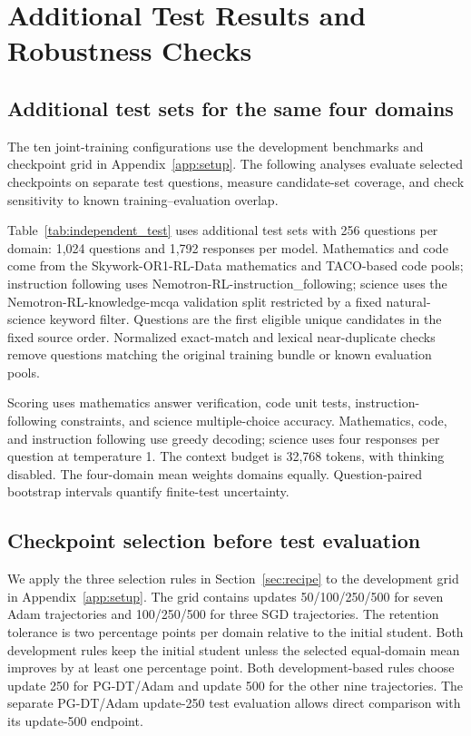 \section{Additional Test Results and Robustness Checks}
\label{app:completed_results}

\subsection{Additional test sets for the same four domains}
\label{app:independent_domain_test}

The ten joint-training configurations use the development benchmarks and checkpoint grid in Appendix~\ref{app:setup}. The following analyses evaluate selected checkpoints on separate test questions, measure candidate-set coverage, and check sensitivity to known training--evaluation overlap.

Table~\ref{tab:independent_test} uses additional test sets with 256 questions per domain: 1,024 questions and 1,792 responses per model. Mathematics and code come from the Skywork-OR1-RL-Data mathematics and TACO-based code pools; instruction following uses Nemotron-RL-instruction\_following; science uses the Nemotron-RL-knowledge-mcqa validation split restricted by a fixed natural-science keyword filter. Questions are the first eligible unique candidates in the fixed source order. Normalized exact-match and lexical near-duplicate checks remove questions matching the original training bundle or known evaluation pools.

Scoring uses mathematics answer verification, code unit tests, instruction-following constraints, and science multiple-choice accuracy. Mathematics, code, and instruction following use greedy decoding; science uses four responses per question at temperature 1. The context budget is 32,768 tokens, with thinking disabled. The four-domain mean weights domains equally. Question-paired bootstrap intervals quantify finite-test uncertainty.



\subsection{Checkpoint selection before test evaluation}
\label{app:completed_selection}

We apply the three selection rules in Section~\ref{sec:recipe} to the development grid in Appendix~\ref{app:setup}. The grid contains updates 50/100/250/500 for seven Adam trajectories and 100/250/500 for three SGD trajectories. The retention tolerance is two percentage points per domain relative to the initial student. Both development rules keep the initial student unless the selected equal-domain mean improves by at least one percentage point. Both development-based rules choose update 250 for PG-DT/Adam and update 500 for the other nine trajectories. The separate PG-DT/Adam update-250 test evaluation allows direct comparison with its update-500 endpoint.

